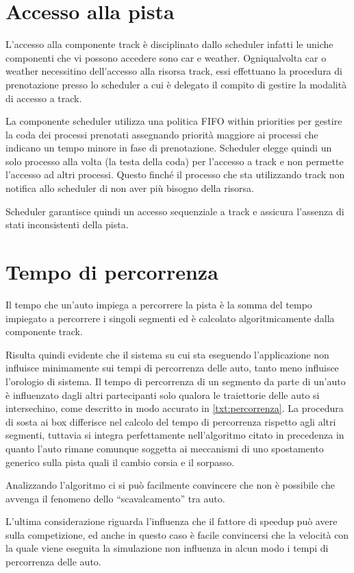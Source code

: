 \documentclass[11pt,a4paper]{report}
\begin{document}
\section{Accesso alla pista}
L'accesso alla componente track è disciplinato dallo scheduler infatti le uniche componenti che vi possono accedere sono car e weather. Ogniqualvolta car o weather necessitino dell'accesso alla risorsa track, essi effettuano la procedura di prenotazione presso lo scheduler a cui è delegato il compito di gestire la modalità di accesso a track.

La componente scheduler utilizza una politica FIFO within priorities per gestire la coda dei processi prenotati assegnando priorità maggiore ai processi che indicano un tempo minore in fase di prenotazione.
Scheduler elegge quindi un solo processo alla volta (la testa della coda) per l'accesso a track e non permette l'accesso ad altri processi. Questo finché il processo che sta utilizzando track non notifica allo scheduler di non aver più bisogno della risorsa.

Scheduler garantisce quindi un accesso sequenziale a track e assicura l'assenza di stati inconsistenti della pista.

\section{Tempo di percorrenza}
Il tempo che un'auto impiega a percorrere la pista è la somma del tempo impiegato a percorrere i singoli segmenti ed è calcolato algoritmicamente dalla componente track.

Risulta quindi evidente che il sistema su cui sta eseguendo l'applicazione non influisce minimamente sui tempi di percorrenza delle auto, tanto meno influisce l'orologio di sistema.
Il tempo di percorrenza di un segmento da parte di un'auto è influenzato dagli altri partecipanti solo qualora le traiettorie delle auto si intersechino, come descritto in modo accurato in \ref{txt:percorrenza}.
La procedura di sosta ai box differisce nel calcolo del tempo di percorrenza rispetto agli altri segmenti, tuttavia si integra perfettamente nell'algoritmo citato in precedenza in quanto l'auto rimane comunque soggetta ai meccanismi di uno spostamento generico sulla pista quali il cambio corsia e il sorpasso.

Analizzando l'algoritmo ci si può facilmente convincere che non è possibile che avvenga il fenomeno dello ``scavalcamento'' tra auto.

L'ultima considerazione riguarda l'influenza che il fattore di speedup può avere sulla competizione, ed anche in questo caso è facile convincersi che la velocità con la quale viene eseguita la simulazione non influenza in alcun modo i tempi di percorrenza delle auto.
\end{document}
